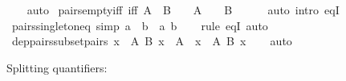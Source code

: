 \begin{isabellebody}
%
\isadelimproof
\ \ %
\endisadelimproof
%
\isatagproof
{}\isamarkupfalse%
\ auto%
\endisatagproof
{\isafoldproof}%
%
\isadelimproof
\isanewline
%
\endisadelimproof
\isanewline
{}\isamarkupfalse%
\ pairs{\isacharunderscore}{\kern0pt}empty{\isacharunderscore}{\kern0pt}iff\ {\isacharbrackleft}{\kern0pt}iff{\isacharbrackright}{\kern0pt}{\isacharcolon}{\kern0pt}\ {\isachardoublequoteopen}A\ {\isasymtimes}\ B\ {\isacharequal}{\kern0pt}\ {\isacharbraceleft}{\kern0pt}{\isacharbraceright}{\kern0pt}\ {\isasymlongleftrightarrow}\ A\ {\isacharequal}{\kern0pt}\ {\isacharbraceleft}{\kern0pt}{\isacharbraceright}{\kern0pt}\ {\isasymor}\ B\ {\isacharequal}{\kern0pt}\ {\isacharbraceleft}{\kern0pt}{\isacharbraceright}{\kern0pt}{\isachardoublequoteclose}\isanewline
%
\isadelimproof
\ \ %
\endisadelimproof
%
\isatagproof
{}\isamarkupfalse%
\ {\isacharparenleft}{\kern0pt}auto\ intro{\isacharbang}{\kern0pt}{\isacharcolon}{\kern0pt}\ eqI{\isacharparenright}{\kern0pt}%
\endisatagproof
{\isafoldproof}%
%
\isadelimproof
\isanewline
%
\endisadelimproof
\isanewline
{}\isamarkupfalse%
\ pairs{\isacharunderscore}{\kern0pt}singleton{\isacharunderscore}{\kern0pt}eq\ {\isacharbrackleft}{\kern0pt}simp{\isacharbrackright}{\kern0pt}{\isacharcolon}{\kern0pt}\ {\isachardoublequoteopen}{\isacharbraceleft}{\kern0pt}a{\isacharbraceright}{\kern0pt}\ {\isasymtimes}\ {\isacharbraceleft}{\kern0pt}b{\isacharbraceright}{\kern0pt}\ {\isacharequal}{\kern0pt}\ {\isacharbraceleft}{\kern0pt}{\isasymlangle}a{\isacharcomma}{\kern0pt}\ b{\isasymrangle}{\isacharbraceright}{\kern0pt}{\isachardoublequoteclose}\isanewline
%
\isadelimproof
\ \ %
\endisadelimproof
%
\isatagproof
{}\isamarkupfalse%
\ {\isacharparenleft}{\kern0pt}rule\ eqI{\isacharparenright}{\kern0pt}\ auto%
\endisatagproof
{\isafoldproof}%
%
\isadelimproof
\isanewline
%
\endisadelimproof
\isanewline
{}\isamarkupfalse%
\ dep{\isacharunderscore}{\kern0pt}pairs{\isacharunderscore}{\kern0pt}subset{\isacharunderscore}{\kern0pt}pairs{\isacharcolon}{\kern0pt}\ {\isachardoublequoteopen}{\isasymSum}x\ {\isasymin}\ A{\isachardot}{\kern0pt}\ B\ x\ {\isasymsubseteq}\ A\ {\isasymtimes}\ {\isacharparenleft}{\kern0pt}{\isasymUnion}x\ {\isasymin}\ A{\isachardot}{\kern0pt}\ B\ x{\isacharparenright}{\kern0pt}{\isachardoublequoteclose}\isanewline
%
\isadelimproof
\ \ %
\endisadelimproof
%
\isatagproof
{}\isamarkupfalse%
\ auto%
\endisatagproof
{\isafoldproof}%
%
\isadelimproof
%
\endisadelimproof
%
\begin{isamarkuptext}%
Splitting quantifiers:%

\end{isamarkuptext}
\end{isabellebody}
